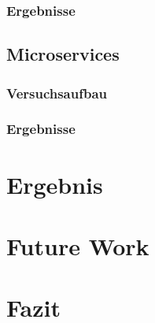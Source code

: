 \documentclass[a4paper]{report}
\begin{document}
\subsection{Ergebnisse}
\section{Microservices}
\subsection{Versuchsaufbau}
\subsection{Ergebnisse}

\chapter{Ergebnis}

\chapter{Future Work}

\chapter{Fazit}

\printbibliography
\end{document}
